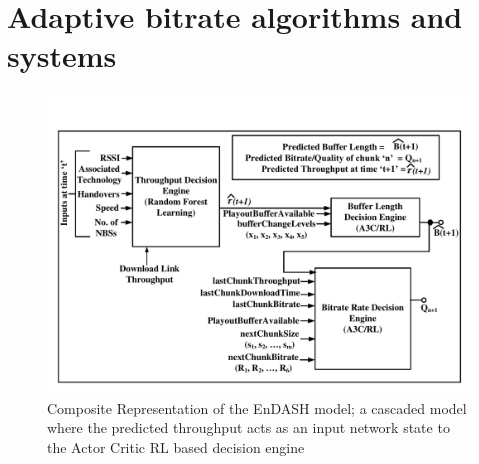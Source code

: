 \section{Adaptive bitrate algorithms and systems}


\begin{figure}[h!]
	\begin{center}
		\includegraphics[width=0.9\linewidth]{img/EnDASH_system}
	\end{center}
	\caption{\label{fig:EnDASH_system} Composite Representation of the EnDASH model; a cascaded model where the predicted throughput acts as an input network state to the Actor Critic RL based decision engine}
\end{figure}